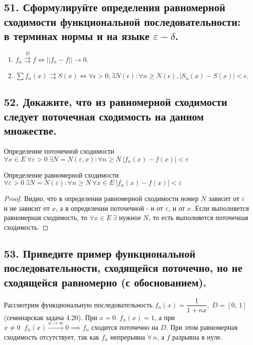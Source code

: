 \documentclass[a4paper, fleqn]{article}
\begin{document}
    \subsection*{51. Сформулируйте определения равномерной сходимости функциональной последовательности: в терминах нормы и на языке $\varepsilon - \delta$.}
    \begin{enumerate}
        \item $f_n \overset{D}{\rightrightarrows} f \iff ||f_n - f|| \rightarrow 0$. \\
      \item $\sum f_n(x) \rightrightarrows S(x) \iff \forall \epsilon > 0, \exists N(\epsilon): \forall n \geqslant N(\epsilon), |S_n(x) - S(x)| < \epsilon$. \\
    \end{enumerate}
        
        
        \subsection*{52. Докажите, что из равномерной сходимости следует поточечная сходимость на данном множестве.}
        Определение поточечной сходимости $\forall x \in E\ \forall \varepsilon > 0\ \exists N = N(\varepsilon, x) : \forall n \geqslant N\ |f_n(x) - f(x)| < \varepsilon$

        Определение равномерной сходимости $\forall \varepsilon > 0\ \exists N = N(\varepsilon) : \forall n \geqslant N\ \forall x \in E\ |f_n(x) - f(x)| < \varepsilon$
        \begin{proof}
        Видно, что в определении равномерной сходимости номер $N$ зависит от $\varepsilon$ и не зависит от $x$, а в определении поточечной - и от $\varepsilon$, и от $x$. Если выполняется равномерная сходимость, то $\forall x \in E\ \exists$ нужное $N$, то есть выполняется поточечная сходимость.
        \end{proof}
    
    \subsection*{53. Приведите пример функциональной последовательности, сходящейся поточечно, но не сходящейся равномерно (с обоснованием).}

    Рассмотрим функциональную последовательность $f_n(x) = \dfrac1{1 + nx}, \; D = [0, \, 1]$ (семинарская задача 4.20). 
    При $x = 0 \;\; f_n(x) = 1$, а при $x \ne 0 \;\; f_n(x) \xrightarrow{n \to \infty} 0 \implies f_n$ сходится поточечно на $D$. 
    При этом равномерная сходимость отсутствует, так как $f_n$ непрерывна $\forall \, n$, а $f$ разрывна в нуле.
        
\end{document}
